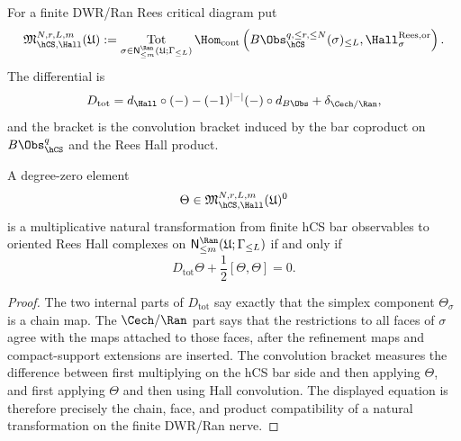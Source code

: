 \begin{definition}
\label{def:finite-hcs-rees-hall-convolution-lie-algebra-abstract}
For a finite DWR/Ran Rees critical diagram put
\[
 \mathfrak M_{\hCS,\Hall}^{N,r,L,m}(\mathfrak U)
 :=
 \operatorname*{Tot}_{\sigma\in
 \mathsf N^{\Ran}_{\le m}(\mathfrak U;\Gamma_{\le L})}
 \Hom_{\mathrm{cont}}
 \left(
 B\Obs_{\hCS}^{q,\le r,\le N}(\sigma)_{\le L},
 \Hall_{\sigma}^{\mathrm{Rees},\mathrm{or}}
 \right).
\]
The differential is
\[
 D_{\mathrm{tot}}
 =
 d_{\Hall}\circ(-)
 -(-1)^{|-|}(-)\circ d_{B\Obs}
 +\delta_{\Cech/\Ran},
\]
and the bracket is the convolution bracket induced by the bar
coproduct on $B\Obs_{\hCS}^{q}$ and the Rees Hall product.
\end{definition}

\begin{lemma}
\label{lem:finite-gluing-mc}
A degree-zero element
\[
 \Theta\in
 \mathfrak M_{\hCS,\Hall}^{N,r,L,m}(\mathfrak U)^0
\]
is a multiplicative natural transformation from finite hCS bar
observables to oriented Rees Hall complexes on
$\mathsf N^{\Ran}_{\le m}(\mathfrak U;\Gamma_{\le L})$ if and only if
\[
 D_{\mathrm{tot}}\Theta+\frac12[\Theta,\Theta]=0.
\]
\end{lemma}

\begin{proof}
The two internal parts of $D_{\mathrm{tot}}$ say exactly that the
simplex component $\Theta_\sigma$ is a chain map. The
$\Cech/\Ran$ part says that the restrictions to all faces of $\sigma$
agree with the maps attached to those faces, after the refinement maps
and compact-support extensions are inserted. The convolution bracket
measures the difference between first multiplying on the hCS bar side
and then applying $\Theta$, and first applying $\Theta$ and then using
Hall convolution. The displayed equation is therefore precisely the
chain, face, and product compatibility of a natural transformation on
the finite DWR/Ran nerve.
\end{proof}

